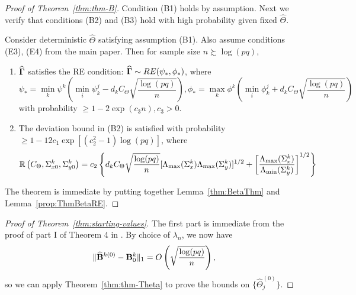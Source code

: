 \begin{proof}[Proof of Theorem~\ref{thm:thm-B}]
Condition (B1) holds by assumption. Next we verify that conditions (B2) and (B3) hold with high probability given fixed $\widehat \Theta$.

\begin{Lemma}\label{prop:ThmBetaRE}
Consider deterministic $\widehat \Theta$ satisfying assumption (B1). Also assume conditions (E3), (E4) from the main paper. Then for sample size $n \succsim \log (pq)$,

\begin{enumerate}
\item $\widehat {{\boldsymbol{\Gamma}}}$ satisfies the RE condition: $ \widehat {{\boldsymbol{\Gamma}}} \sim RE (\psi_*, \phi_*)$, where 
%
$$
\psi_* = \min_k \psi^k \left( \min_i \psi_k^j - d_k C_\Theta \sqrt{ \frac{ \log (pq)}{n}}\right), 
\phi_* = \max_k \phi^k \left( \min_i \phi_k^j + d_k C_\Theta \sqrt{ \frac{ \log (pq)}{n}}\right)
$$
%
with probability $\geq 1 - 2 \exp(c_3 n), c_3>0$.
%
\item The deviation bound in (B2) is satisfied with probability $ \geq 1 - 12 c_1 \exp[ (c_2^2-1) \log (pq)]$, where
%
$$
{\mathbb{R}} \left(C_\Theta, \Sigma_{x0}^k, \Sigma_{y0}^k \right) =
c_2 \left\{ d_k C_\Theta \sqrt{ \frac{ \log (pq)}{n}}
[ \Lambda_{\max} (\Sigma_x^k) \Lambda_{\max} (\Sigma_y^k)]^{1/2} +
\left[ \frac{\Lambda_{\max} (\Sigma_x^k)}{\Lambda_{\min} (\Sigma_y^k) } \right]^{1/2} \right\}
$$
%
\end{enumerate}
\end{Lemma}

The theorem is immediate by putting together Lemma~\ref{thm:BetaThm} and Lemma~\ref{prop:ThmBetaRE}.
\end{proof}

\begin{proof}[Proof of Theorem~\ref{thm:starting-values}]
The first part is immediate from the proof of part I of Theorem 4 in \cite{LinEtal16}. By choice of $\lambda_n$, we now have
%
$$
\| \widehat {{\mathbf{B}}}^{k (0)} - {\mathbf{B}}^k_0 \|_1 = O\left( \sqrt{ \frac{ \log (pq)}{n}} \right),
$$
%
so we can apply Theorem~\ref{thm:thm-Theta} to prove the bounds on $\{\widehat \Theta_j^{(0)} \}$.
\end{proof}

%



